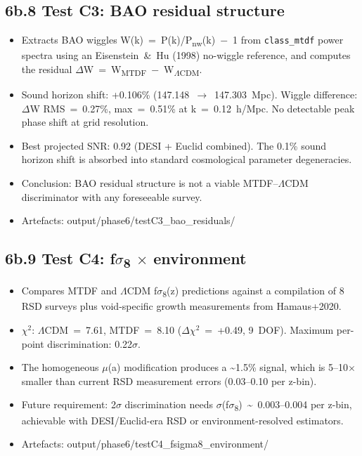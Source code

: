 \documentclass[11pt,a4paper]{article}
\begin{document}
\subsection{6b.8 Test C3: BAO residual structure}
\begin{itemize}
  \item Extracts BAO wiggles W(k)~=~P(k)/P\textsubscript{nw}(k)~$-$~1 from \texttt{class\_\allowbreak{}mtdf} power spectra using an Eisenstein~\&~Hu (1998) no-wiggle reference, and computes the residual $\Delta$W~=~W\textsubscript{MTDF}~$-$~W\textsubscript{$\Lambda$CDM}.
  \item Sound horizon shift: +0.106\% (147.148~$\rightarrow$~147.303~Mpc). Wiggle difference: $\Delta$W RMS~=~0.27\%, max~=~0.51\% at k~=~0.12~h/\allowbreak{}Mpc. No detectable peak phase shift at grid resolution.
  \item Best projected SNR: 0.92 (DESI + Euclid combined). The 0.1\% sound horizon shift is absorbed into standard cosmological parameter degeneracies.
  \item Conclusion: BAO residual structure is not a viable MTDF--$\Lambda$CDM discriminator with any foreseeable survey.
  \item Artefacts: output/\allowbreak{}phase6/\allowbreak{}testC3\_\allowbreak{}bao\_\allowbreak{}residuals/\allowbreak{}
\end{itemize}

\subsection{6b.9 Test C4: f$\sigma$\textsubscript{8} $\times$ environment}
\begin{itemize}
  \item Compares MTDF and $\Lambda$CDM f$\sigma$\textsubscript{8}(z) predictions against a compilation of 8 RSD surveys plus void-specific growth measurements from Hamaus+2020.
  \item $\chi$$^{2}$: $\Lambda$CDM~=~7.61, MTDF~=~8.10 ($\Delta$$\chi$$^{2}$~=~+0.49, 9~DOF). Maximum per-point discrimination: 0.22$\sigma$.
  \item The homogeneous $\mu$(a) modification produces a \~{}1.5\% signal, which is 5--10$\times$ smaller than current RSD measurement errors (0.03--0.10 per z-bin).
  \item Future requirement: 2$\sigma$ discrimination needs $\sigma$(f$\sigma$\textsubscript{8})~\~{}~0.003--0.004 per z-bin, achievable with DESI/\allowbreak{}Euclid-era RSD or environment-resolved estimators.
  \item Artefacts: output/\allowbreak{}phase6/\allowbreak{}testC4\_\allowbreak{}fsigma8\_\allowbreak{}environment/\allowbreak{}
\end{itemize}
\end{document}
